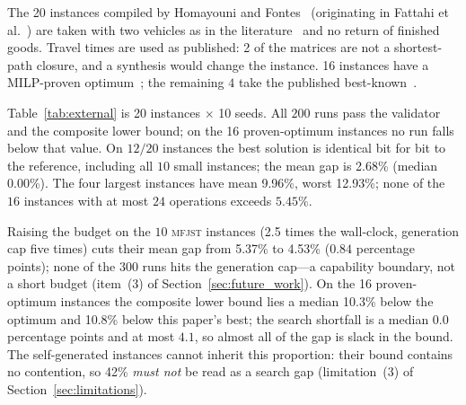\documentclass[manuscript,screen,review]{acmart}
\newcommand{\NSeeds}{10}
\newcommand{\LBGapMed}{42\%}
\newcommand{\PubNInst}{20}
\newcommand{\PubNOpt}{16}                 %
\newcommand{\PubNMatch}{12}               %
\newcommand{\PubGapMean}{2.68\%}          %
\newcommand{\PubGapMed}{0.00\%}
\newcommand{\PubGapMax}{12.93\%}
\newcommand{\PubGapBig}{9.96\%}           %
\newcommand{\PubBudgetRatio}{2.5}
\newcommand{\PubGapLoBudget}{5.37\%}      %
\newcommand{\PubGapHiBudget}{4.53\%}      %
\newcommand{\PubBudgetGainPP}{0.84}       %
\newcommand{\PubLBSlack}{10.3\%}          %
\newcommand{\PubLBTotal}{10.8\%}          %
\newcommand{\PubLBResidMed}{0.0}          %
\newcommand{\PubLBResidMax}{4.1}          %
\newcommand{\PubNLayoutBad}{2}            %
\begin{document}
The \PubNInst{} instances compiled by Homayouni and Fontes~\cite{homayouni2021production} (originating in Fattahi et al.~\cite{fattahi2007mathematical}) are taken with two vehicles as in the literature~\cite{lim2023twophase} and no return of finished goods.
Travel times are used as published: \PubNLayoutBad{} of the matrices are not a shortest-path closure, and a synthesis would change the instance.
\PubNOpt{} instances have a MILP-proven optimum~\cite{homayouni2021production}; the remaining $4$ take the published best-known~\cite{lim2023twophase}.

Table~\ref{tab:external} is \PubNInst{} instances $\times$ \NSeeds{} seeds.
All $200$ runs pass the validator and the composite lower bound; on the \PubNOpt{} proven-optimum instances no run falls below that value.
On $\PubNMatch{}/\PubNInst{}$ instances the best solution is identical bit for bit to the reference, including all $10$ small instances; the mean gap is \PubGapMean{} (median \PubGapMed{}).
The four largest instances have mean \PubGapBig{}, worst \PubGapMax{}; none of the $16$ instances with at most $24$ operations exceeds $5.45\%$.

\begin{table}[t]
\caption{Degenerate comparison on public benchmarks (exclusivity removed).
\textsc{opt}: MILP-proven optimum; \textsc{bk}: published best-known; gap from the best of \NSeeds{} seeds.
An asterisk marks a bitwise-identical best solution.}
\label{tab:external}
\centering
\small

\end{table}

Raising the budget on the $10$ \textsc{mfjst} instances (\PubBudgetRatio{} times the wall-clock, generation cap five times) cuts their mean gap from \PubGapLoBudget{} to \PubGapHiBudget{} ($\PubBudgetGainPP$ percentage points); none of the $300$ runs hits the generation cap---a capability boundary, not a short budget (item~(3) of Section~\ref{sec:future_work}).
On the \PubNOpt{} proven-optimum instances the composite lower bound lies a median \PubLBSlack{} below the optimum and \PubLBTotal{} below this paper's best; the search shortfall is a median $\PubLBResidMed$ percentage points and at most $\PubLBResidMax$, so almost all of the gap is slack in the bound.
The self-generated instances cannot inherit this proportion: their bound contains no contention, so \LBGapMed{} \emph{must not} be read as a search gap (limitation~(3) of Section~\ref{sec:limitations}).
\end{document}
